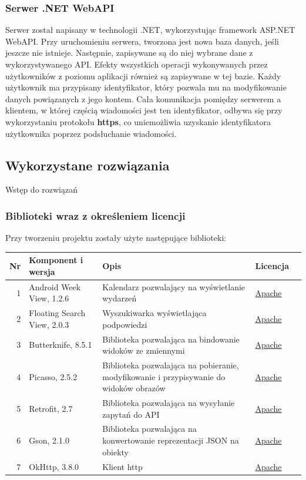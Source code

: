 \documentclass[10pt,a4paper]{article}
\begin{document}
\subsubsection{Serwer .NET WebAPI}
Serwer został napisany w technologii .NET, wykorzystując framework ASP.NET WebAPI. Przy uruchomieniu serwera, tworzona jest nowa baza danych, jeśli jeszcze nie istnieje. Następnie, zapisywane są do niej wybrane dane z wykorzystywanego API. Efekty wszystkich operacji wykonywanych przez użytkowników z poziomu aplikacji również są zapisywane w tej bazie. Każdy użytkownik ma przypisany identyfikator, który pozwala mu na modyfikowanie danych powiązanych z jego kontem. Cała komunikacja pomiędzy serwerem a klientem, w której częścią wiadomości jest ten identyfikator, odbywa się przy wykorzystaniu protokołu \textbf{https}, co uniemożliwia uzyskanie identyfikatora użytkownika poprzez podsłuchanie wiadomości.

\subsection{Wykorzystane rozwiązania}
Wstęp do rozwiązań

\subsubsection{Biblioteki wraz z określeniem licencji}
Przy tworzeniu projektu zostały użyte następujące biblioteki:

\begin{table}[H]
	\begin{tabularx}{\textwidth}{|r|l|X|l|c|}
		\hline
		\textbf{Nr} & \textbf{Komponent i wersja} & \textbf{Opis} & \textbf{Licencja} & \\
		\hline
		1 & 
		Android Week View, 1.2.6 &
		Kalendarz pozwalający na wyświetlanie wydarzeń &
		\mbox{\hyperref[abbr:lic]{Apache}} &
		\cite{bib1} \\
		\hline
		2 & 
		Floating Search View, 2.0.3 &
		Wyszukiwarka wyświetlająca podpowiedzi &
		\mbox{\hyperref[abbr:lic]{Apache}} &
		\cite{bib2} \\
		\hline
		3 & 
		Butterknife, 8.5.1 &
		Biblioteka pozwalająca na bindowanie widoków ze zmiennymi &
		\mbox{\hyperref[abbr:lic]{Apache}} &
		\cite{bib3} \\
		\hline
		4 & 
		Picasso, 2.5.2 &
		Biblioteka pozwalająca na pobieranie, modyfikowanie i przypisywanie do widoków obrazów &
		\mbox{\hyperref[abbr:lic]{Apache}} &
		\cite{bib4} \\
		\hline
		5 & 
		Retrofit, 2.7 &
		Biblioteka pozwalająca na wysyłanie zapytań do API &
		\mbox{\hyperref[abbr:lic]{Apache}} &
		\cite{bib5} \\
		\hline
		6 & 
		Gson, 2.1.0 &
		Biblioteka pozwalająca na konwertowanie reprezentacji JSON na obiekty &
		\mbox{\hyperref[abbr:lic]{Apache}} &
		\cite{bib6} \\
		\hline
		7 & 
		OkHttp, 3.8.0 &
		Klient http &
		\mbox{\hyperref[abbr:lic]{Apache}} &
		\cite{bib7} \\
		\hline
	\end{tabularx}
\end{table}
\end{document}
